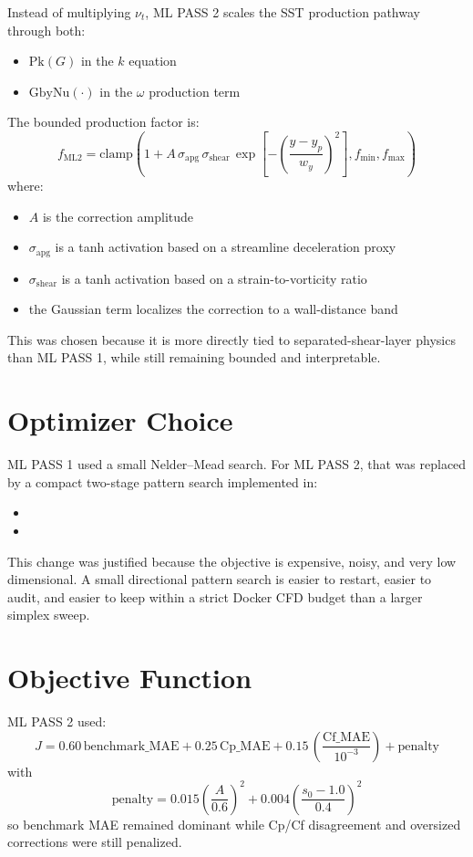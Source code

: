 \documentclass[11pt]{article}
\begin{document}
Instead of multiplying \(\nu_t\), ML PASS 2 scales the SST production pathway
through both:
\begin{itemize}[leftmargin=1.2em]
\item \(\mathrm{Pk}(G)\) in the \(k\) equation
\item \(\mathrm{GbyNu}(\cdot)\) in the \(\omega\) production term
\end{itemize}

The bounded production factor is:
\[
f_{\mathrm{ML2}}
=
\mathrm{clamp}\left(
1 + A \, \sigma_{\mathrm{apg}} \, \sigma_{\mathrm{shear}} \,
\exp\left[-\left(\frac{y-y_p}{w_y}\right)^2\right],
f_{\min}, f_{\max}
\right)
\]
where:
\begin{itemize}[leftmargin=1.2em]
\item \(A\) is the correction amplitude
\item \(\sigma_{\mathrm{apg}}\) is a tanh activation based on a streamline
deceleration proxy
\item \(\sigma_{\mathrm{shear}}\) is a tanh activation based on a
strain-to-vorticity ratio
\item the Gaussian term localizes the correction to a wall-distance band
\end{itemize}

This was chosen because it is more directly tied to separated-shear-layer
physics than ML PASS 1, while still remaining bounded and interpretable.

\section{Optimizer Choice}
ML PASS 1 used a small Nelder--Mead search. For ML PASS 2, that was replaced by
a compact two-stage pattern search implemented in:
\begin{itemize}[leftmargin=1.2em]
\item {}
\item {}
\end{itemize}

This change was justified because the objective is expensive, noisy, and very
low dimensional. A small directional pattern search is easier to restart, easier
to audit, and easier to keep within a strict Docker CFD budget than a larger
simplex sweep.

\section{Objective Function}
ML PASS 2 used:
\[
J = 0.60\,\mathrm{benchmark\_MAE}
  + 0.25\,\mathrm{Cp\_MAE}
  + 0.15\,\left(\frac{\mathrm{Cf\_MAE}}{10^{-3}}\right)
  + \mathrm{penalty}
\]
with
\[
\mathrm{penalty}
= 0.015 \left(\frac{A}{0.6}\right)^2
+ 0.004 \left(\frac{s_0-1.0}{0.4}\right)^2
\]
so benchmark MAE remained dominant while Cp/Cf disagreement and oversized
corrections were still penalized.
\end{document}
